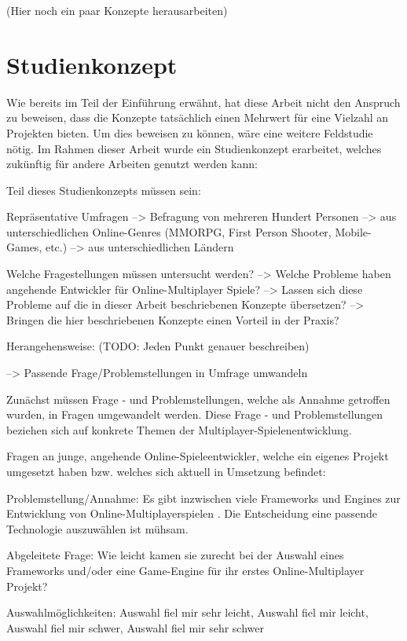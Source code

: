 (Hier noch ein paar Konzepte herausarbeiten)


\section{Studienkonzept}
\label{sec:studienkonzept}

Wie bereits im Teil der Einführung erwähnt, hat diese Arbeit nicht den Anspruch zu beweisen, dass die Konzepte tatsächlich einen Mehrwert für eine Vielzahl an Projekten bieten. Um dies beweisen zu können, wäre eine weitere Feldstudie nötig. Im Rahmen dieser Arbeit wurde ein Studienkonzept erarbeitet, welches zukünftig für andere Arbeiten genutzt werden kann:

Teil dieses Studienkonzepts müssen sein:

Repräsentative Umfragen
	--> Befragung von mehreren Hundert Personen
	--> aus unterschiedlichen Online-Genres (MMORPG, First Person Shooter, Mobile-Games, etc.)
	--> aus unterschiedlichen Ländern
	
Welche Fragestellungen müssen untersucht werden?
	--> Welche Probleme haben angehende Entwickler für Online-Multiplayer Spiele?
	--> Lassen sich diese Probleme auf die in dieser Arbeit beschriebenen Konzepte übersetzen?
	--> Bringen die hier beschriebenen Konzepte einen Vorteil in der Praxis?

Herangehensweise: (TODO: Jeden Punkt genauer beschreiben)

	--> Passende Frage/Problemstellungen in Umfrage umwandeln
	
Zunächst müssen Frage - und Problemstellungen, welche als Annahme getroffen wurden, in Fragen umgewandelt werden. Diese Frage - und Problemstellungen beziehen sich auf konkrete Themen der Multiplayer-Spielenentwicklung.
	
Fragen an junge, angehende Online-Spieleentwickler, welche ein eigenes Projekt umgesetzt haben bzw. welches sich aktuell in Umsetzung befindet:

Problemstellung/Annahme: Es gibt inzwischen viele Frameworks und Engines zur Entwicklung von Online-Multiplayerspielen \cite{MFatihMAR.2021}. Die Entscheidung eine passende Technologie auszuwählen ist mühsam.

Abgeleitete Frage: Wie leicht kamen sie zurecht bei der Auswahl eines Frameworks und/oder eine Game-Engine für ihr erstes Online-Multiplayer Projekt?

Auswahlmöglichkeiten: Auswahl fiel mir sehr leicht, Auswahl fiel mir leicht, Auswahl fiel mir schwer, Auswahl fiel mir sehr schwer

